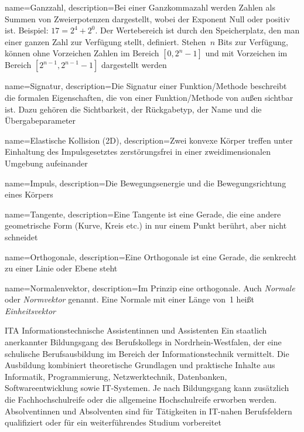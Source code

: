 {
    name={Ganzzahl},
    description={Bei einer Ganzkommazahl werden Zahlen als Summen von Zweierpotenzen dargestellt, wobei der Exponent Null oder positiv ist. Beispiel: $17 = 2^4 + 2^0$. Der Wertebereich ist durch den Speicherplatz, den man einer ganzen Zahl zur Verfügung stellt, definiert. Stehen~$n$ Bits zur Verfügung, können ohne Vorzeichen Zahlen im Bereich $[0, 2^n-1]$ und mit Vorzeichen im Bereich $[2^{n-1}, 2^{n-1}-1]$ dargestellt werden} 
}


{
	name={Signatur},
	description={Die Signatur einer Funktion/Methode beschreibt die formalen Eigenschaften, die von einer Funktion/Methode von außen sichtbar ist. Dazu gehören die Sichtbarkeit, der Rückgabetyp, der Name und die Übergabeparameter} 
}

{
	name={Elastische Kollision (2D)},
	description={Zwei konvexe Körper treffen unter Einhaltung des Impulsgesetztes zerstörungsfrei in einer zweidimensionalen Umgebung aufeinander} 
}

{
	name={Impuls},
	description={Die Bewegungsenergie und die Bewegungsrichtung eines Körpers} 
}

{
	name={Tangente},
	description={Eine Tangente ist eine Gerade, die eine andere geometrische Form (Kurve, Kreis etc.) in nur einem Punkt berührt, aber nicht schneidet}
}

{
	name={Orthogonale},
	description={Eine Orthogonale ist eine Gerade, die senkrecht zu einer Linie oder Ebene steht}
}

{
	name={Normalenvektor},
	description={Im Prinzip eine \gls{orthogonale}. Auch \emph{Normale} oder \emph{Normvektor} genannt. Eine Normale mit einer Länge von~1 heißt \emph{Einheitsvektor}}
}




	{ITA}
	{Informationstechnische Assistentinnen und Assistenten}
	{Ein staatlich anerkannter Bildungsgang des Berufskollegs in Nordrhein-Westfalen, der eine schulische Berufsausbildung im Bereich der	Informationstechnik vermittelt. Die Ausbildung kombiniert theoretische Grundlagen und praktische Inhalte aus Informatik, Programmierung,	Netzwerktechnik, Datenbanken, Softwareentwicklung sowie IT-Systemen. Je nach Bildungsgang kann zusätzlich die Fachhochschulreife oder die allgemeine Hochschulreife erworben werden. Absolventinnen und Absolventen sind für Tätigkeiten in IT-nahen Berufsfeldern qualifiziert oder für ein weiterführendes Studium vorbereitet}




